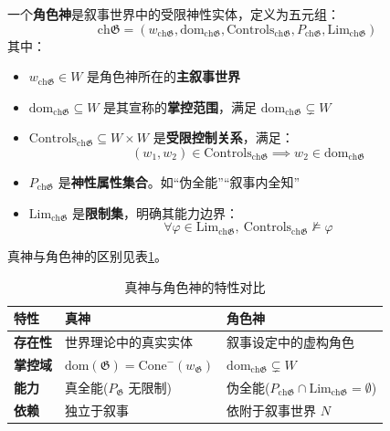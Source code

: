 \documentclass[lang=cn,newtx,10pt,scheme=chinese]{elegantbook}
\newcommand{\G}{\mathfrak{G}} %
\begin{document}
\begin{definition}[角色神]
    一个\textbf{角色神}是叙事世界中的受限神性实体，定义为五元组：
    \[
        \mathrm{ch}\mathfrak{G} = \left(w_{\mathrm{ch}\mathfrak{G}}, \mathrm{dom}_{\mathrm{ch}\mathfrak{G}}, \mathrm{Controls}_{\mathrm{ch}\mathfrak{G}}, P_{\mathrm{ch}\mathfrak{G}}, \mathrm{Lim}_{\mathrm{ch}\mathfrak{G}}\right)
    \]
    其中：
    \begin{itemize}
        \item $w_{\mathrm{ch}\mathfrak{G}} \in W$ 是角色神所在的\textbf{主叙事世界}
        \item $\mathrm{dom}_{\mathrm{ch}\mathfrak{G}} \subseteq W$ 是其宣称的\textbf{掌控范围}，满足 $\mathrm{dom}_{\mathrm{ch}\mathfrak{G}} \subsetneq W$
        \item $\mathrm{Controls}_{\mathrm{ch}\mathfrak{G}} \subseteq W \times W$ 是\textbf{受限控制关系}，满足：
              \[
                  (w_1, w_2) \in \mathrm{Controls}_{\mathrm{ch}\mathfrak{G}} \implies w_2 \in \mathrm{dom}_{\mathrm{ch}\mathfrak{G}}
              \]
        \item $P_{\mathrm{ch}\mathfrak{G}}$ 是\textbf{神性属性集合}。如“伪全能”“叙事内全知”
        \item $\mathrm{Lim}_{\mathrm{ch}\mathfrak{G}}$ 是\textbf{限制集}，明确其能力边界：
              \[
                  \forall \varphi \in \mathrm{Lim}_{\mathrm{ch}\mathfrak{G}}, \ \mathrm{Controls}_{\mathrm{ch}\mathfrak{G}} \not\models \varphi
              \]
    \end{itemize}

\end{definition}

真神与角色神的区别见表\ref{tab:g_vs_chg}。

\begin{table}[htbp]
    \centering
    \caption{真神与角色神的特性对比}
    \label{tab:g_vs_chg}
    \begin{tabular}{|l|l|l|}
        \hline
        \textbf{特性}  & \textbf{真神}                                & \textbf{角色神}                                                                               \\
        \hline
        \textbf{存在性} & 世界理论中的真实实体                                 & 叙事设定中的虚构角色                                                                                 \\
        \hline
        \textbf{掌控域} & $\mathrm{dom}(\G) = \mathrm{Cone}^-(w_\G)$ & $\mathrm{dom}_{\mathrm{ch}\mathfrak{G}} \subsetneq W$                                      \\
        \hline
        \textbf{能力}  & 真全能($P_\G$ 无限制)                            & 伪全能($P_{\mathrm{ch}\mathfrak{G}} \cap \mathrm{Lim}_{\mathrm{ch}\mathfrak{G}} = \emptyset$) \\
        \hline
        \textbf{依赖}  & 独立于叙事                                      & 依附于叙事世界 $N$                                                                                \\
        \hline
    \end{tabular}
\end{table}
\end{document}
